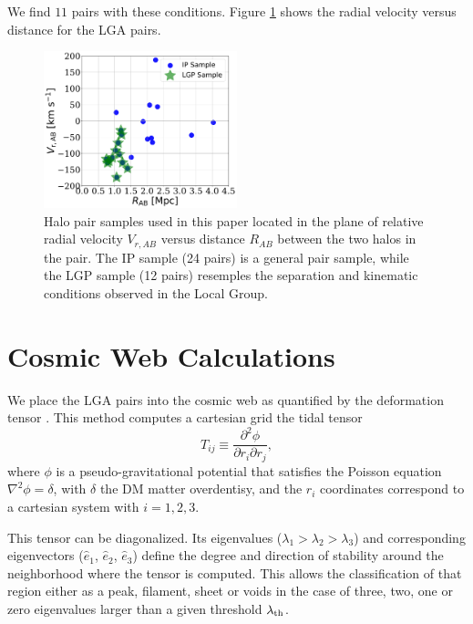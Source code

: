 \documentclass[useAMS,usenatbib,usegraphicx]{mn2e}
\begin{document}
We find $11$ pairs with these conditions.
Figure \ref{fig:samples} shows the radial velocity versus distance for
the LGA pairs.

\begin{figure}
\centering
\includegraphics[width=0.5\textwidth]{v_r_pairs.pdf}
\caption{Halo pair samples used in this paper located in the
  plane of relative radial velocity $V_{r,AB}$ versus 
  distance $R_{AB}$ between the two halos in the pair.
  The IP sample (24 pairs) is a general pair sample, while the LGP
  sample (12 pairs) resemples the separation and kinematic
  conditions observed in the Local Group.} 
\label{fig:samples}
\end{figure}


\section{Cosmic Web Calculations}
\label{sec:CosmicWeb}

We place the LGA pairs into the cosmic web as quantified by the
deformation tensor  
\citep{2007MNRAS.375..489H,2009MNRAS.396.1815F}.
This method computes a cartesian grid the tidal tensor 
\begin{equation}
T_{ij} \equiv \frac{\partial^2\phi}{\partial r_i \partial r_j},
\end{equation}
%
where $\phi$ is a pseudo-gravitational potential that satisfies the
Poisson equation $\nabla^2\phi=\delta$, with $\delta$ the DM matter
overdentisy, and the $r_i$ coordinates correspond to a cartesian
system with $i=1,2,3$.   

This tensor can be diagonalized.
Its eigenvalues ($\lambda_1 > \lambda_2 > \lambda_3$) and
corresponding eigenvectors ($\hat{e}_1$, $\hat{e}_2$, $\hat{e}_3$)
define the degree and direction of stability around the neighborhood
where the tensor is computed. 
This allows the classification of that region either as a peak,
filament, sheet or voids in the case of three, two, one or zero
eigenvalues larger than a given threshold $\lambda_{\rm th}$.
\end{document}
